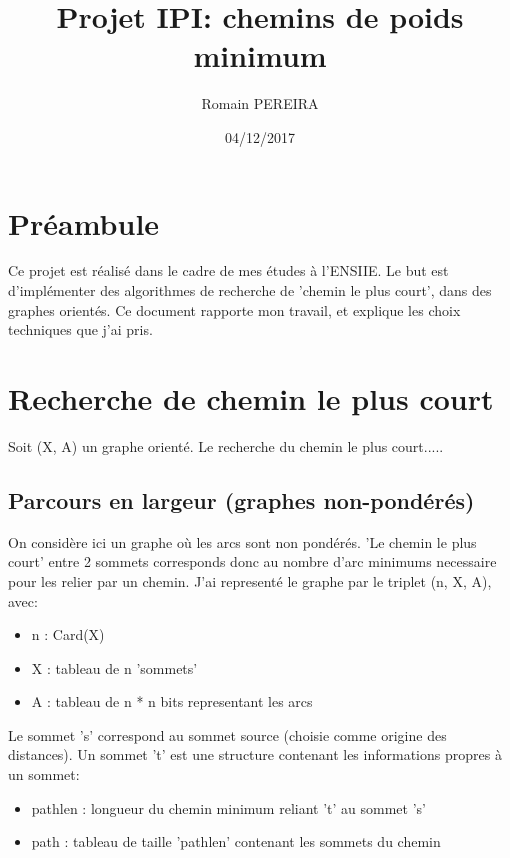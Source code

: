 \documentclass[a4paper,10pt]{article}
\title{Projet IPI: chemins de poids minimum}
\author{Romain PEREIRA}
\date{04/12/2017}
\begin{document}
  \maketitle
  \tableofcontents

  \section*{Préambule}
    Ce projet est réalisé dans le cadre de mes études à l'ENSIIE.\newline
    Le but est d'implémenter des algorithmes de recherche de 'chemin le plus court', dans des graphes orientés.\newline
    Ce document rapporte mon travail, et explique les choix techniques que j'ai pris.\newline

  \newpage
  \section{Recherche de chemin le plus court}
    Soit (X, A) un graphe orienté. Le recherche du chemin le plus court.....

  \subsection{Parcours en largeur (graphes non-pondérés)}
    On considère ici un graphe où les arcs sont non pondérés.\newline
    'Le chemin le plus court' entre 2 sommets corresponds donc au nombre d'arc minimums necessaire pour les relier par un chemin.\newline
    J'ai representé le graphe par le triplet (n, X, A), avec:
    \begin{itemize}[label=-]
      \item n : Card(X)
      \item X : tableau de n 'sommets'
      \item A : tableau de n * n bits representant les arcs
    \end{itemize}
    
    Le sommet 's' correspond au sommet source (choisie comme origine des distances).
    Un sommet 't' est une structure contenant les informations propres à un sommet:
    \begin{itemize}[label=-]
      \item pathlen : longueur du chemin minimum reliant 't' au sommet 's'
      \item path : tableau de taille 'pathlen' contenant les sommets du chemin
    \end{itemize}
    
\end{document}
